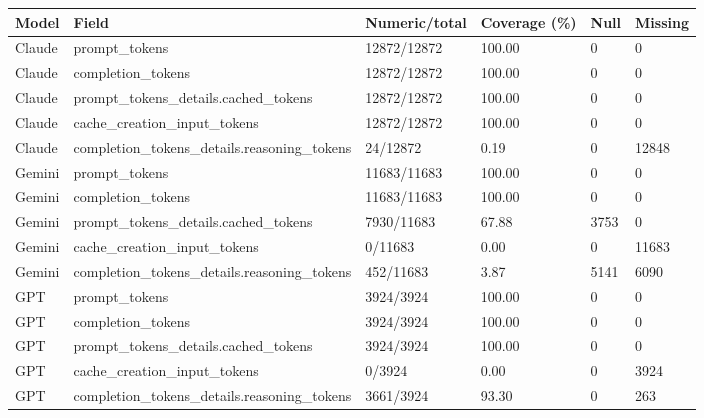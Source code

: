 \begin{tabular}{llllll}
\hline
Model & Field & Numeric/total & Coverage (\%) & Null & Missing \\
\hline
Claude & prompt\_tokens & 12872/12872 & 100.00 & 0 & 0 \\
Claude & completion\_tokens & 12872/12872 & 100.00 & 0 & 0 \\
Claude & prompt\_tokens\_details.cached\_tokens & 12872/12872 & 100.00 & 0 & 0 \\
Claude & cache\_creation\_input\_tokens & 12872/12872 & 100.00 & 0 & 0 \\
Claude & completion\_tokens\_details.reasoning\_tokens & 24/12872 & 0.19 & 0 & 12848 \\
Gemini & prompt\_tokens & 11683/11683 & 100.00 & 0 & 0 \\
Gemini & completion\_tokens & 11683/11683 & 100.00 & 0 & 0 \\
Gemini & prompt\_tokens\_details.cached\_tokens & 7930/11683 & 67.88 & 3753 & 0 \\
Gemini & cache\_creation\_input\_tokens & 0/11683 & 0.00 & 0 & 11683 \\
Gemini & completion\_tokens\_details.reasoning\_tokens & 452/11683 & 3.87 & 5141 & 6090 \\
GPT & prompt\_tokens & 3924/3924 & 100.00 & 0 & 0 \\
GPT & completion\_tokens & 3924/3924 & 100.00 & 0 & 0 \\
GPT & prompt\_tokens\_details.cached\_tokens & 3924/3924 & 100.00 & 0 & 0 \\
GPT & cache\_creation\_input\_tokens & 0/3924 & 0.00 & 0 & 3924 \\
GPT & completion\_tokens\_details.reasoning\_tokens & 3661/3924 & 93.30 & 0 & 263 \\
\hline
\end{tabular}
